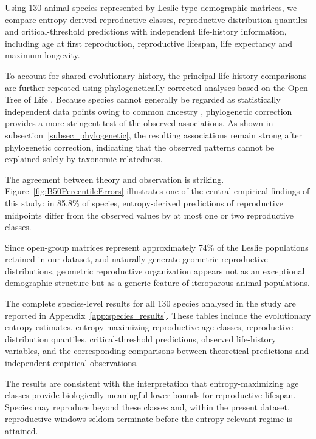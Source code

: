 \documentclass[10pt,a4paper]{amsart}
\theoremstyle{definition}
\theoremstyle{remark}
\numberwithin{equation}{section}
\begin{document}
Using 130 animal species represented by Leslie-type demographic
matrices, we compare entropy-derived reproductive classes,
reproductive distribution quantiles and critical-threshold predictions
with independent life-history information, including age at first
reproduction, reproductive lifespan, life expectancy and maximum
longevity.

To account for shared evolutionary history, the principal
life-history comparisons are further repeated using
phylogenetically corrected analyses based on the Open Tree of Life \cite{OpenTreeOfLife}.
Because species cannot generally be regarded as statistically
independent data points owing to common ancestry
\cite{Felsenstein1985,HarveyPagel1991,Pagel1999},
phylogenetic correction provides a more stringent test of the
observed associations. As shown in
subsection~\ref{subsec_phylogenetic}, the resulting associations
remain strong after phylogenetic correction, indicating that the
observed patterns cannot be explained solely by taxonomic
relatedness.

The agreement between theory and observation is striking.
Figure~\ref{fig:B50PercentileErrors} illustrates one of the
central empirical findings of this study: in 85.8\% of species,
entropy-derived predictions of reproductive midpoints differ from the
observed values by at most one or two reproductive classes.

Since open-group matrices represent approximately 74\% of the Leslie
populations retained in our dataset, and naturally generate geometric
reproductive distributions, geometric reproductive organization
appears not as an exceptional demographic structure but as a generic
feature of iteroparous animal populations.

The complete species-level results for all 130 species analysed in the
study are reported in Appendix~\ref{app:species_results}. These tables include the
evolutionary entropy estimates, entropy-maximizing reproductive age
classes, reproductive distribution quantiles, critical-threshold
predictions, observed life-history variables, and the corresponding
comparisons between theoretical predictions and independent empirical
observations.

The results are consistent with the interpretation that
entropy-maximizing age classes provide biologically meaningful
lower bounds for reproductive lifespan. Species may reproduce
beyond these classes and, within the present dataset,
reproductive windows seldom terminate before the
entropy-relevant regime is attained.
\end{document}
